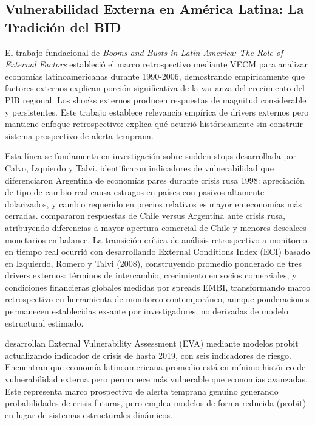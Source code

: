 \documentclass[3p,11pt,draft,natbib=false]{elsarticle}
\begin{document}
\subsection{Vulnerabilidad Externa en América Latina: La Tradición del BID}

El trabajo fundacional de \citet{izquierdo2008booms} \textit{Booms and Busts in Latin America: The Role of External Factors} estableció el marco retrospectivo mediante VECM para analizar economías latinoamericanas durante 1990-2006, demostrando empíricamente que factores externos explican porción significativa de la varianza del crecimiento del PIB regional. Los shocks externos producen respuestas de magnitud considerable y persistentes. Este trabajo establece relevancia empírica de drivers externos pero mantiene enfoque retrospectivo: explica qué ocurrió históricamente sin construir sistema prospectivo de alerta temprana.

Esta línea se fundamenta en investigación sobre sudden stops desarrollada por Calvo, Izquierdo y Talvi. \citet{calvo2003sudden} identificaron indicadores de vulnerabilidad que diferenciaron Argentina de economías pares durante crisis rusa 1998: apreciación de tipo de cambio real causa estragos en países con pasivos altamente dolarizados, y cambio requerido en precios relativos es mayor en economías más cerradas. \citet{calvo2005sudden} compararon respuestas de Chile versus Argentina ante crisis rusa, atribuyendo diferencias a mayor apertura comercial de Chile y menores descalces monetarios en balance. La transición crítica de análisis retrospectivo a monitoreo en tiempo real ocurrió con \citet{talvi2013latin} desarrollando External Conditions Index (ECI) basado en Izquierdo, Romero y Talvi (2008), construyendo promedio ponderado de tres drivers externos: términos de intercambio, crecimiento en socios comerciales, y condiciones financieras globales medidas por spreads EMBI, transformando marco retrospectivo en herramienta de monitoreo contemporáneo, aunque ponderaciones permanecen establecidas ex-ante por investigadores, no derivadas de modelo estructural estimado.

\citet{cavallo2023external} desarrollan External Vulnerability Assessment (EVA) mediante modelos probit actualizando indicador de crisis de \citet{catao2014external} hasta 2019, con seis indicadores de riesgo. Encuentran que economía latinoamericana promedio está en mínimo histórico de vulnerabilidad externa pero permanece más vulnerable que economías avanzadas. Este representa marco prospectivo de alerta temprana genuino generando probabilidades de crisis futuras, pero emplea modelos de forma reducida (probit) en lugar de sistemas estructurales dinámicos.
\end{document}
